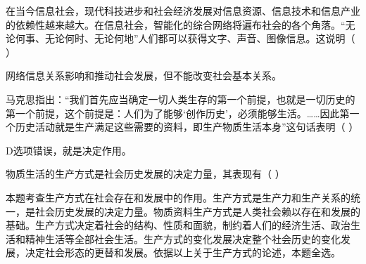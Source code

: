 \question 在当今信息社会，现代科技进步和社会经济发展对信息资源、信息技术和信息产业的依赖性越来越大。在信息社会，智能化的综合网络将遍布社会的各个角落。``无论何事、无论何时、无论何地''人们都可以获得文字、声音、图像信息。这说明（
）
\par{}
\begin{solution}网络信息关系影响和推动社会发展，但不能改变社会基本关系。
\end{solution}
\question 马克思指出：``我们首先应当确定一切人类生存的第一个前提，也就是一切历史的第一个前提，这个前提是：人们为了能够`创作历史'，必须能够生活。\ldots{}\ldots{}因此第一个历史活动就是生产满足这些需要的资料，即生产物质生活本身''这句话表明（
）
\par{}
\begin{solution}D选项错误，就是决定作用。
\end{solution}
\question 物质生活的生产方式是社会历史发展的决定力量，其表现有（ ）
\par\twoch{\textcolor{red}{它制约着全部社会生活}}{\textcolor{red}{它决定社会形态的更替和发展}}{\textcolor{red}{它决定社会的面貌}}{\textcolor{red}{它决定社会的性质}}
\begin{solution}本题考查生产方式在社会存在和发展中的作用。生产方式是生产力和生产关系的统一，是社会历史发展的决定力量。物质资料生产方式是人类社会赖以存在和发展的基础。生产方式决定着社会的结构、性质和面貌，制约着人们的经济生活、政治生活和精神生活等全部社会生活。生产方式的变化发展决定整个社会历史的变化发展，决定社会形态的更替和发展。依据以上关于生产方式的论述，本题全选。
\end{solution}
